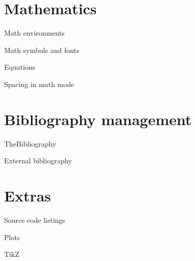 \documentclass[xetex,mathserif]{beamer}
\begin{document}
\section{Mathematics}
\begin{frame}{Math environments}
\end{frame}

\begin{frame}{Math symbols and fonts}
\end{frame}

\begin{frame}{Equations}
\end{frame}

\begin{frame}{Spacing in math mode}
\end{frame}

\section{Bibliography management}
\begin{frame}{TheBibliography}
\end{frame}

\begin{frame}{External bibliography}
\end{frame}

\section{Extras}
\begin{frame}{Source code listings}
\end{frame}

\begin{frame}{Plots}
\end{frame}

\begin{frame}{TikZ}
\end{frame}
\end{document}
